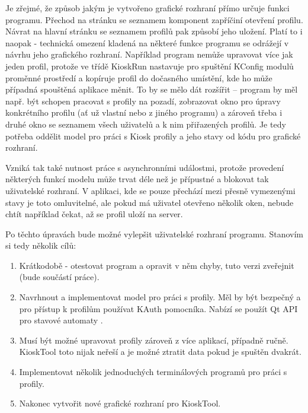 {Je zřejmé, že způsob jakým je vytvořeno grafické rozhraní přímo určuje funkci programu. Přechod na stránku se seznamem komponent zapříčiní otevření profilu. Návrat na hlavní stránku se seznamem profilů pak způsobí jeho uložení. Platí to i naopak - technická omezení kladená na některé funkce programu se odrážejí v návrhu jeho grafického rozhraní. Například program nemůže upravovat více jak jeden profil, protože ve třídě KioskRun nastavuje pro spuštění KConfig modulů proměnné prostředí a kopíruje profil do dočasného umístění, kde ho může případná spouštěná aplikace měnit. To by se mělo dát rozšířit -- program by měl např. být schopen pracovat s profily na pozadí, zobrazovat okno pro úpravy konkrétního profilu (ať už vlastní nebo z jiného programu) a zároveň třeba i druhé okno se seznamem všech uživatelů a k nim přiřazených profilů. Je tedy potřeba oddělit model pro práci s Kiosk profily a jeho stavy od kódu pro grafické rozhraní.

Vzniká tak také nutnost práce s asynchronními událostmi, protože provedení některých funkcí modelu může trvat déle než je přípustné a blokovat tak uživatelské rozhraní. V aplikaci, kde se pouze přechází mezi přesně vymezenými stavy je toto omluvitelné, ale pokud má uživatel otevřeno několik oken, nebude chtít například čekat, až se profil uloží na server.

Po těchto úpravách bude možné vylepšit uživatelské rozhraní programu. Stanovím si tedy několik cílů:
\begin{enumerate}
\item Krátkodobě - otestovat program a opravit v něm chyby, tuto verzi zveřejnit (bude součástí práce).
\item Navrhnout a implementovat model pro práci s profily. Měl by být bezpečný a pro přístup k profilům používat KAuth pomocníka. Nabízí se použít Qt API pro stavové automaty \cite{QtStatMach}.
\item Musí být možné upravovat profily zároveň z více aplikací, případně ručně. KioskTool toto nijak neřeší a je možné ztratit data pokud je spuštěn dvakrát.
\item Implementovat několik jednoduchých terminálových programů pro práci s profily.
\item Nakonec vytvořit nové grafické rozhraní pro KioskTool.
\end{enumerate}

}
